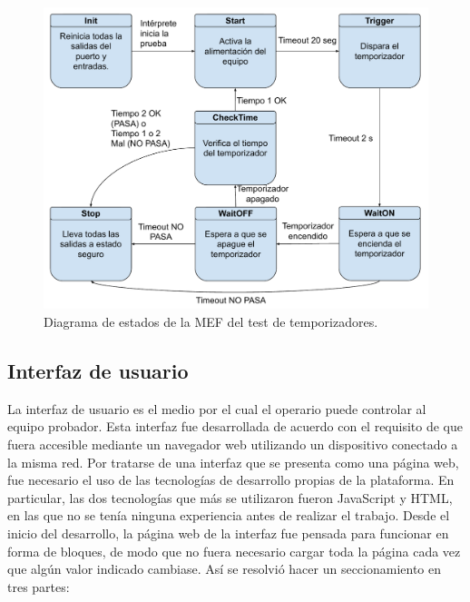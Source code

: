 \begin{figure}[H]
	\centering
	\includegraphics[width=1\textwidth]{./Figures/FSMTestTemp.pdf}
	\caption{Diagrama de estados de la MEF del test de temporizadores.}
	\label{fig:FSMTestTemp}
\end{figure}

\subsection{Interfaz de usuario}

La interfaz de usuario es el medio por el cual el operario puede controlar al equipo probador.
Esta interfaz fue desarrollada de acuerdo con el requisito de que fuera accesible mediante un navegador web utilizando un dispositivo conectado a la misma red.
Por tratarse de una interfaz que se presenta como una página web, fue necesario el uso de las tecnologías de desarrollo propias de la plataforma. En particular, las dos tecnologías que más se utilizaron fueron JavaScript y HTML, en las que no se tenía ninguna experiencia antes de realizar el trabajo.
Desde el inicio del desarrollo, la página web de la interfaz fue pensada para funcionar en forma de bloques, de modo que no fuera necesario cargar toda la página cada vez que algún valor indicado cambiase. Así se resolvió hacer un seccionamiento en tres partes:

